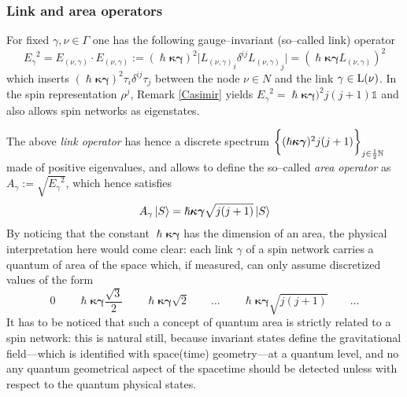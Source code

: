 \subsubsection{Link and area operators}
For fixed $\gamma,\nu\in\Gamma$ one has the following gauge--invariant (so--called link) operator
\begin{equation}\label{area_op}
    {E_\gamma}^2=E_{(\nu,\gamma)}\cdot E_{(\nu,\gamma)}:=(\hslash\boldsymbol{\kappa}\boldsymbol{\gamma})^2\bigg|{L_{(\nu,\gamma)}}_i\delta^{ij}{L_{(\nu,\gamma)}}_j\bigg|=\left(\hslash\boldsymbol{\kappa}\boldsymbol{\gamma}L_{(\nu,\gamma)}\right)^2
\end{equation}
which inserts $(\hslash\boldsymbol{\kappa}\boldsymbol{\gamma})^2\tau_i\delta^{ij}\tau_j$ between the node $\nu\in N$ and the link $\gamma\in\text{\normalfont L}(\nu)$. In the spin representation $\rho^j$, Remark \ref{Casimir} yields ${E_\gamma}^2=\hslash\boldsymbol{\kappa}\boldsymbol{\gamma})^2j(j+1)\mathbb{1}$ and also allows spin networks as eigenstates. 

The above \emph{link operator} has hence a discrete spectrum $\bigg\{(\hslash\boldsymbol{\kappa}\boldsymbol{\gamma})^2j(j+1)\bigg\}_{j\in\frac{1}{2}\mathbb{N}}$ made of positive eigenvalues, and allows to define the so--called \emph{area operator} as $A_\gamma:=\sqrt{{E_\gamma}^2}$, which hence satisfies
\begin{equation}\label{area_spec}
    A_\gamma\left| S \right >=\hslash\boldsymbol{\kappa}\boldsymbol{\gamma}\sqrt{j(j+1)}\left| S \right >
\end{equation}
By noticing that the constant $\hslash\boldsymbol{\kappa}\boldsymbol{\gamma}$ has the dimension of an area, the physical interpretation here would come clear: each link $\gamma$ of a spin network carries a quantum of area of the space which, if measured, can only assume discretized values of the form 
$$0\qquad\hslash\boldsymbol{\kappa}\boldsymbol{\gamma}\frac{\sqrt{3}}{2}\qquad\hslash\boldsymbol{\kappa}\boldsymbol{\gamma}\sqrt{2}\qquad\hdots\qquad\hslash\boldsymbol{\kappa}\boldsymbol{\gamma}\sqrt{j(j+1)}\qquad\hdots$$
It has to be noticed that such a concept of quantum area is strictly related to a spin network: this is natural still, because invariant states define the gravitational field---which is identified with space(time) geometry---at a quantum level, and no any quantum geometrical aspect of the spacetime should be detected unless with respect to the quantum physical states.

